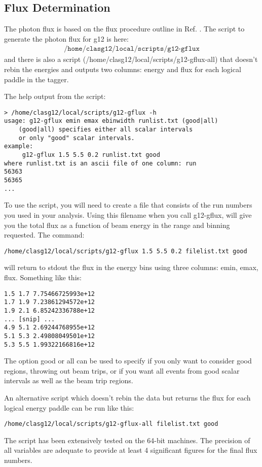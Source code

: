 \subsection{Flux Determination}

The photon flux is based on the flux procedure outline in Ref. \cite{clas.flux.note}. The script to generate the photon flux for g12 is here:
\begin{align}
    \texttt{/home/clasg12/local/scripts/g12-gflux} \nonumber
\end{align} and there is also a script (/home/clasg12/local/scripts/g12-gflux-all) that doesn't rebin the energies and outputs two columns: energy and flux for each logical paddle in the tagger.

The help output from the script:
\begin{verbatim}
> /home/clasg12/local/scripts/g12-gflux -h
usage: g12-gflux emin emax ebinwidth runlist.txt (good|all)
    (good|all) specifies either all scalar intervals
    or only "good" scalar intervals.
example:
     g12-gflux 1.5 5.5 0.2 runlist.txt good
where runlist.txt is an ascii file of one column: run
56363
56365
...
\end{verbatim}

To use the script, you will need to create a file that consists of the run numbers you used in your analysis. Using this filename when you call g12-gflux, will give you the total flux as a function of beam energy in the range and binning requested. The command:
\begin{verbatim}
/home/clasg12/local/scripts/g12-gflux 1.5 5.5 0.2 filelist.txt good
\end{verbatim}

will return to stdout the flux in the energy bins using three columns: emin, emax, flux. Something like this:
\begin{verbatim}
1.5 1.7 7.75466725993e+12
1.7 1.9 7.23861294572e+12
1.9 2.1 6.85242336788e+12
... [snip] ...
4.9 5.1 2.69244768955e+12
5.1 5.3 2.49808049501e+12
5.3 5.5 1.99322166816e+12
\end{verbatim}

The option good or all can be used to specify if you only want to consider good regions, throwing out beam trips, or if you want all events from good scalar intervals as well as the beam trip regions.

An alternative script which doesn't rebin the data but returns the flux for each logical energy paddle can be run like this:
\begin{verbatim}
/home/clasg12/local/scripts/g12-gflux-all filelist.txt good
\end{verbatim}
The script has been extensively tested on the 64-bit machines. The precision of all variables are adequate to provide at least 4 significant figures for the final flux numbers.


